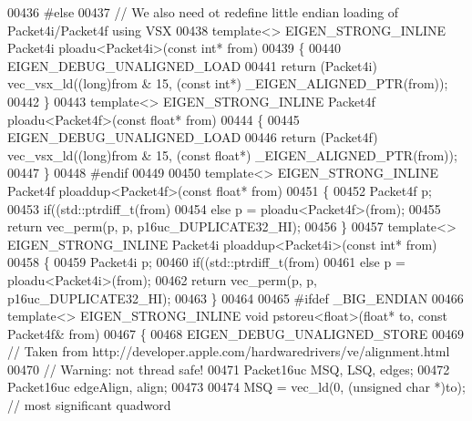 \begin{DoxyCode}
{00436 \textcolor{preprocessor}{#else}
00437 \textcolor{comment}{// We also need ot redefine little endian loading of Packet4i/Packet4f using VSX}
00438 \textcolor{keyword}{template}<> EIGEN\_STRONG\_INLINE Packet4i ploadu<Packet4i>(\textcolor{keyword}{const} \textcolor{keywordtype}{int}* from)
00439 \{
00440   EIGEN\_DEBUG\_UNALIGNED\_LOAD
00441   \textcolor{keywordflow}{return} (Packet4i) vec\_vsx\_ld((\textcolor{keywordtype}{long})from & 15, (\textcolor{keyword}{const} \textcolor{keywordtype}{int}*) \_EIGEN\_ALIGNED\_PTR(from));
00442 \}
00443 \textcolor{keyword}{template}<> EIGEN\_STRONG\_INLINE Packet4f ploadu<Packet4f>(\textcolor{keyword}{const} \textcolor{keywordtype}{float}* from)
00444 \{
00445   EIGEN\_DEBUG\_UNALIGNED\_LOAD
00446   \textcolor{keywordflow}{return} (Packet4f) vec\_vsx\_ld((\textcolor{keywordtype}{long})from & 15, (\textcolor{keyword}{const} \textcolor{keywordtype}{float}*) \_EIGEN\_ALIGNED\_PTR(from));
00447 \}
00448 \textcolor{preprocessor}{#endif}
00449 
00450 \textcolor{keyword}{template}<> EIGEN\_STRONG\_INLINE Packet4f ploaddup<Packet4f>(\textcolor{keyword}{const} \textcolor{keywordtype}{float}*   from)
00451 \{
00452   Packet4f p;
00453   \textcolor{keywordflow}{if}((std::ptrdiff\_t(from) %
00454   \textcolor{keywordflow}{else}                                  p = ploadu<Packet4f>(from);
00455   \textcolor{keywordflow}{return} vec\_perm(p, p, p16uc\_DUPLICATE32\_HI);
00456 \}
00457 \textcolor{keyword}{template}<> EIGEN\_STRONG\_INLINE Packet4i ploaddup<Packet4i>(\textcolor{keyword}{const} \textcolor{keywordtype}{int}*     from)
00458 \{
00459   Packet4i p;
00460   \textcolor{keywordflow}{if}((std::ptrdiff\_t(from) %
00461   \textcolor{keywordflow}{else}                                  p = ploadu<Packet4i>(from);
00462   \textcolor{keywordflow}{return} vec\_perm(p, p, p16uc\_DUPLICATE32\_HI);
00463 \}
00464 
00465 \textcolor{preprocessor}{#ifdef \_BIG\_ENDIAN}
00466 \textcolor{keyword}{template}<> EIGEN\_STRONG\_INLINE \textcolor{keywordtype}{void} pstoreu<float>(\textcolor{keywordtype}{float}*  to, \textcolor{keyword}{const} Packet4f& from)
00467 \{
00468   EIGEN\_DEBUG\_UNALIGNED\_STORE
00469   \textcolor{comment}{// Taken from http://developer.apple.com/hardwaredrivers/ve/alignment.html}
00470   \textcolor{comment}{// Warning: not thread safe!}
00471   Packet16uc MSQ, LSQ, edges;
00472   Packet16uc edgeAlign, align;
00473 
00474   MSQ = vec\_ld(0, (\textcolor{keywordtype}{unsigned} \textcolor{keywordtype}{char} *)to);                     \textcolor{comment}{// most significant quadword}
}
\end{DoxyCode}
